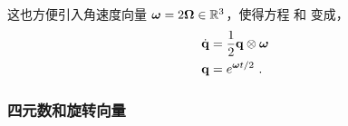 这也方便引入角速度向量 ${\bm \omega}=2{\bm \Omega}\in{\mathbb R}^3$，使得方程  和  变成，
%
\begin{align}
\dot{{\bf q}} &= \frac12{\bf q}\otimes{\bm \omega} \label{equ:qdot} \\ 
{\bf q} &= e^{{\bm \omega} t/2}
~.
\end{align}
%


\subsubsection{四元数和旋转向量}
\label{sec:quatAndVector}

